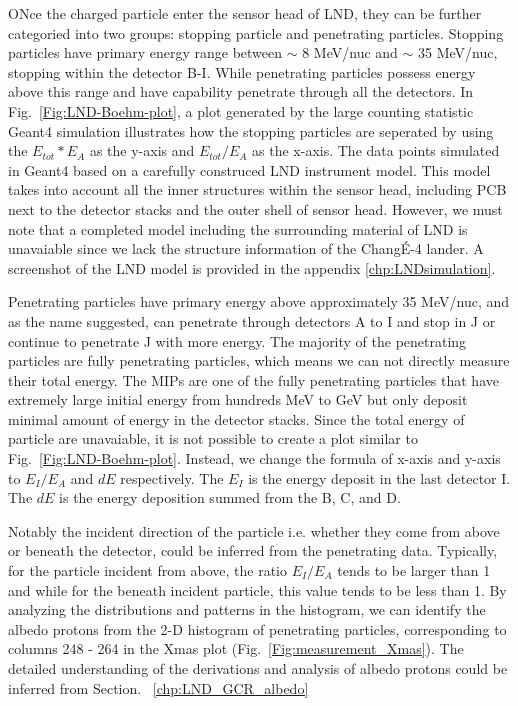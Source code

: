ONce the charged particle enter the sensor head of \ac{LND}, they can be further categoried into two groups: stopping particle and penetrating particles. Stopping particles have primary energy range between $\sim$ 8 MeV/nuc and $\sim$ 35 MeV/nuc, stopping within the detector B-I. While penetrating particles possess energy above this range and have capability penetrate through all the detectors. In Fig.~\ref{Fig:LND-Boehm-plot}, a plot generated by the large counting statistic \ac{Geant4} \citep{Agostinelli-2003} simulation illustrates how the stopping particles are seperated by using the $E_{tot} * E_A$ as the y-axis and $E_{tot} / E_A$ as the x-axis. The data points simulated in \ac{Geant4} based on a carefully construced \ac{LND} instrument model. This model takes into account all the inner structures within the sensor head, including PCB next to the detector stacks and the outer shell of sensor head. However, we must note that a completed model including the surrounding material of \ac{LND} is unavaiable since we lack the structure information of the Chang\'E-4 lander.
A screenshot of the \ac{LND} model is provided in the appendix \ref{chp:LNDsimulation}. 

Penetrating particles have primary energy above approximately 35 MeV/nuc, and as the name suggested, can penetrate through detectors A to I and stop in J or continue to penetrate J with more energy. The majority of the penetrating particles are fully penetrating particles, which means we can not directly measure their total energy. The \acp{MIP} are one of the fully penetrating particles that have extremely large initial energy from hundreds MeV to GeV but only deposit minimal amount of energy in the detector stacks.
Since the total energy of particle are unavaiable, it is not possible to create a plot similar to Fig.~\ref{Fig:LND-Boehm-plot}. Instead, we change the formula of x-axis and y-axis to $E_I/E_A$ and $dE$ respectively. The $E_I$ is the energy deposit in the last detector I. The $dE$ is the energy deposition summed from the B, C, and D.

Notably the incident direction of the particle i.e. whether they come from above or beneath the detector, could be inferred from the penetrating data. Typically, for the particle incident from above, the ratio $E_I/E_A$ tends to be larger than 1 and while for the beneath incident particle, this value tends to be less than 1. 
By analyzing the distributions and patterns in the histogram, we can identify the albedo protons from the 2-D histogram of penetrating particles, corresponding to columns 248 - 264 in the Xmas plot (Fig.~\ref{Fig:measurement_Xmas}).
The detailed understanding of the derivations and analysis of albedo protons could be inferred from Section. ~\ref{chp:LND_GCR_albedo}


